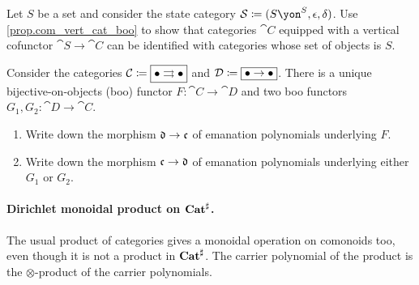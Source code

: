 \documentclass[Book-Poly]{subfiles}
\begin{document}
\begin{exercise}
Let $S$ be a set and consider the state category $\cat{S}\coloneqq(S\yon^S,\epsilon,\delta)$. Use \cref{prop.com_vert_cat_boo} to show that categories $\cat{C}$ equipped with a vertical cofunctor $\cat{S}\to\cat{C}$ can be identified with categories whose set of objects is $S$.
\end{exercise}

\begin{exercise}
Consider the categories $\mathcal{C}\coloneqq\fbox{$\bullet\rightrightarrows\bullet$}$ and $\mathcal{D}\coloneqq\fbox{$\bullet\to\bullet$}$. There is a unique bijective-on-objects (boo) functor $F\colon\cat{C}\to\cat{D}$ and two boo functors $G_1,G_2\colon\cat{D}\to\cat{C}$.
\begin{enumerate}
	\item Write down the morphism $\mathfrak{d}\to\mathfrak{c}$ of emanation polynomials underlying $F$.
	\item Write down the morphism $\mathfrak{c}\to\mathfrak{d}$ of emanation polynomials underlying either $G_1$ or $G_2$.
\qedhere
\end{enumerate}
\end{exercise}

\paragraph{Dirichlet monoidal product on $\mathbf{Cat}^\sharp$.}

The usual product of categories gives a monoidal operation on comonoids too, even though it is not a product in $\mathbf{Cat}^\sharp$. The carrier polynomial of the product is the $\otimes$-product of the carrier polynomials.
\end{document}
